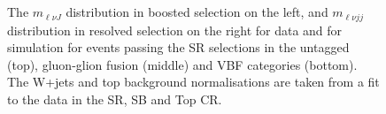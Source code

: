 \begin{figure}[htbp]
{}                                              
\\

\\

\caption{The $m_{\ell \nu J}$ distribution in boosted  selection on the left, and $m_{\ell \nu jj}$ distribution in resolved selection on the right for  data and for simulation for events passing the SR selections in the untagged (top), gluon-glion fusion (middle) and VBF categories (bottom). 
The W+jets and top background normalisations  are taken from a fit to the data in the SR, SB and Top CR.}
    \label{SR}
\end{figure}

